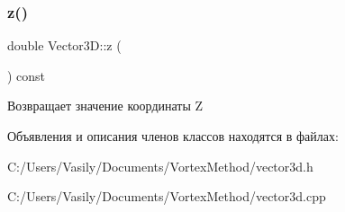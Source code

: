 \subsubsection{\texorpdfstring{z()}{z()}\hspace{0.1cm}{\footnotesize\ttfamily [2/2]}}
{\footnotesize\ttfamily double Vector3\+D\+::z (\begin{DoxyParamCaption}{ }\end{DoxyParamCaption}) const}

Возвращает значение координаты Z 

Объявления и описания членов классов находятся в файлах\+:\begin{DoxyCompactItemize}
\item 
C\+:/\+Users/\+Vasily/\+Documents/\+Vortex\+Method/vector3d.\+h\item 
C\+:/\+Users/\+Vasily/\+Documents/\+Vortex\+Method/vector3d.\+cpp\end{DoxyCompactItemize}
